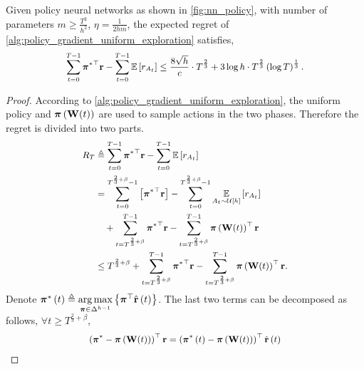 \begin{thm}
\label{thm:policy_gradient_main_result}
    Given policy neural networks as shown in \cref{fig:nn_policy}, with number of parameters $m \ge \frac{T^2}{h^2}$, $\eta = \frac{1}{2 h m}$, the expected regret of \cref{alg:policy_gradient_uniform_exploration} satisfies,
\begin{equation*}
\small
\begin{split}
    \sum\limits_{t=0}^{T-1}{ {\rvpi^*}^\top \rvr } - \sum\limits_{t=0}^{T-1}{ \sE \left[ r_{A_t} \right] } \le \frac{8 \sqrt{h}}{c} \cdot T^{\frac{2}{3}} + 3 \log{h} \cdot T^{\frac{2}{3}} \left(\log{T}\right)^{\frac{1}{3}}.
\end{split}
\end{equation*}
\end{thm}
\begin{proof}
According to \cref{alg:policy_gradient_uniform_exploration}, the uniform policy and ${\boldsymbol{\pi}}\left( {\mathbf{W}}(t) \right)$ are used to sample actions in the two phases. Therefore the regret is divided into two parts.
\begin{equation}
\small
\label{eq:total_regret_decomposition}
\begin{split}
    R_T &\triangleq \sum\limits_{t=0}^{T-1}{ {\rvpi^*}^\top \rvr } - \sum\limits_{t=0}^{T-1}{ \sE \left[ r_{ A_t} \right] } \\
    &= \sum\limits_{t=0}^{T^{\frac{2}{3} + \beta} - 1}{ \left[ {\rvpi^*}^\top \rvr \right]} - \sum\limits_{t=0}^{T^{\frac{2}{3} + \beta} - 1}{ \expectation\limits_{A_t \sim \gU\left[h\right]}{ \left[ r_{A_t} \right] }} \\
    &\quad + \sum\limits_{t=T^{\frac{2}{3} + \beta}}^{T-1}{ {\rvpi^*}^\top \rvr }  - \sum\limits_{t=T^{\frac{2}{3} + \beta}}^{T-1}{ \rvpi\left( \rmW(t) \right)^\top \rvr } \\
    &\le T^{\frac{2}{3} + \beta} + \sum\limits_{t=T^{\frac{2}{3} + \beta}}^{T-1}{ {\rvpi^*}^\top \rvr } - \sum\limits_{t=T^{\frac{2}{3} + \beta}}^{T-1}{ \rvpi\left( \rmW(t) \right)^\top \rvr }.
\end{split}
\end{equation}
Denote ${\boldsymbol{\pi}}^*\left(t\right) \triangleq \operatorname*{arg\,max}\limits_{{\boldsymbol{\pi}} \in \Delta^{h-1}}{\left\{ {\boldsymbol{\pi}}^\top \hat{{\mathbf{r}}}\left(t\right)\right\}}$. The last two terms can be decomposed as follows, $\forall t \ge T^{\frac{2}{3} + \beta}$,
\begin{equation}
\small
\label{eq:playing_learning_phase_regret_decomposition}
\begin{split}
    \left( {\rvpi^*} - \rvpi\left( \rmW(t) \right) \right)^\top \rvr &= \left( {\rvpi^*\left(t\right)} - \rvpi\left( \rmW(t) \right) \right)^\top \hat{\rvr}\left(t\right) \\

\end{split}
\end{equation}
\end{proof}
